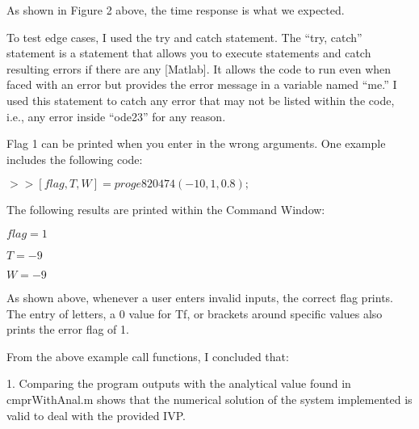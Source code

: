 \documentclass{article}
\begin{document}
{\par \bigskip \par
\par \bigskip \par
\par \bigskip \par
\par \bigskip \par
\par \bigskip \par
\par \bigskip \par
As shown in Figure 2 above, the time response is what we expected.  
\par \medskip \par
To test edge cases, I used the try and catch statement.  The “try, catch” statement is a statement that allows you to execute statements and catch resulting errors if there are any [Matlab].  It allows the code to run even when faced with an error but provides the error message in a variable named “me.”  I used this statement to catch any error that may not be listed within the code, i.e., any error inside “ode23” for any reason.  
\par \medskip \par
Flag 1 can be printed when you enter in the wrong arguments.  One example includes the following code:
\par \medskip \par
$>> [flag, T, W] = proge820474(-10,1,0.8);$
\par \medskip \par
The following results are printed within the Command Window:
\par \medskip \par
$flag = 1$
\par \medskip \par
$T = -9$
\par \medskip \par
$W =  -9$
\par \medskip \par
As shown above, whenever a user enters invalid inputs, the correct flag prints. The entry of letters, a 0 value for Tf, or brackets around specific values also prints the error flag of 1.  
\par \medskip \par
From the above example call functions, I concluded that:
\par \medskip \par
1.	Comparing the program outputs with the analytical value found in cmprWithAnal.m shows that the numerical solution of the system implemented is valid to deal with the provided IVP.
}
\end{document}
